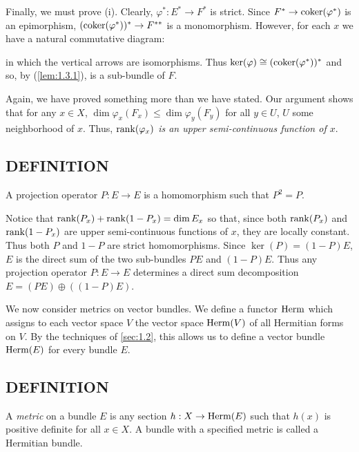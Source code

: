 Finally, we must prove (i). Clearly, $\varphi^*: E^* \to F^*$ is strict. Since $F^* \to \operatorname{coker}(\varphi^*)$ is an epimorphism, $ (\operatorname{coker}(\varphi^*))^* \to F^{**} $ is a monomorphism. However, for each $x$ we have a natural commutative diagram:

\begin{center}
\end{center}

in which the vertical arrows are isomorphisms. Thus $\ker(\varphi) \cong (\operatorname{coker}(\varphi^*))^*$ and so, by (\ref{lem:1.3.1}), is a sub-bundle of $F$. \par 

Again, we have proved something more than we have stated. Our argument shows that for any $x \in X$, $\dim \varphi_x(F_x) \leq \dim \varphi_y(F_y)$ for all $y \in U$, $U$ some neighborhood of $x$. Thus, \textit{$\operatorname{rank}(\varphi_x)$ is an upper semi-continuous function of $x$}. \par 

\subsection{DEFINITION} A projection operator $P: E \to E$ is a homomorphism such that $P^2 = P$. \par

Notice that $\operatorname{rank}(P_x) + \operatorname{rank}(1 - P_x) = \dim E_x$ so that, since both $\operatorname{rank}(P_x)$ and $\operatorname{rank}(1 - P_x)$ are upper semi-continuous functions of $x$, they are locally constant. Thus both $P$ and $1 - P$ are strict homomorphisms. Since $\ker(P) = (1 - P)E$, $E$ is the direct sum of the two sub-bundles $PE$ and $(1 - P)E$. Thus any projection operator $P: E \to E$ determines a direct sum decomposition $E = (PE) \oplus ((1 - P)E)$. \par 

We now consider metrics on vector bundles. We define a functor $\operatorname{Herm}$ which assigns to each vector space $V$ the vector space $\operatorname{Herm}(V)$ of all Hermitian forms on $V$. By the techniques of \cref{sec:1.2}, this allows us to define a vector bundle $\operatorname{Herm}(E)$ for every bundle $E$. \par 

\subsection{DEFINITION} A \textit{metric} on a bundle $E$ is any section $h: X \to \operatorname{Herm}(E)$ such that $h(x)$ is positive definite for all $x \in X$. A bundle with a specified metric is called a Hermitian bundle. \par 


